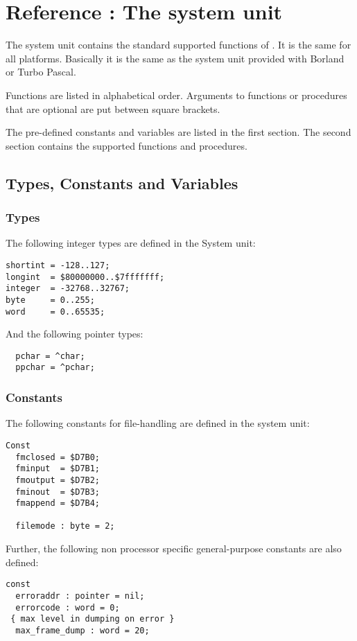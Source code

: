 \documentclass{report}
\begin{document}
%
%

\chapter{Reference : The system unit}
The system unit contains the standard supported functions of \fpc. It is the
same for all platforms. Basically it is the same as the system unit provided
with Borland or Turbo Pascal. 

Functions are listed in alphabetical order.
Arguments to functions or procedures that are optional are put between
square brackets.

The pre-defined constants and variables are listed in the first section. The
second section contains the supported functions and procedures.
\section{Types, Constants and Variables}
\subsection{Types}
The following integer types are defined in the System unit:
\begin{verbatim}
shortint = -128..127;
longint  = $80000000..$7fffffff;
integer  = -32768..32767;
byte     = 0..255;
word     = 0..65535;
\end{verbatim}


And the following pointer types:
\begin{verbatim}
  pchar = ^char;
  ppchar = ^pchar;
\end{verbatim}

\subsection{Constants}
The following constants for file-handling are defined in the system unit:
\begin{verbatim}
Const
  fmclosed = $D7B0;
  fminput  = $D7B1;
  fmoutput = $D7B2;
  fminout  = $D7B3;
  fmappend = $D7B4;

  filemode : byte = 2;
\end{verbatim}
Further, the following non processor specific general-purpose constants
are also defined:
\begin{verbatim} 
const
  erroraddr : pointer = nil;
  errorcode : word = 0;
 { max level in dumping on error }
  max_frame_dump : word = 20;
\end{verbatim}
\end{document}
